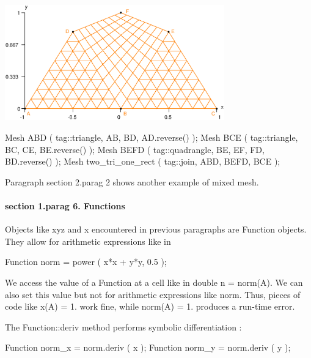{ 
\centerline{\includegraphics[width=95mm]{two-tri-one-rect.eps}} }

\verbatim
   Mesh ABD ( tag::triangle, AB, BD, AD.reverse() );
   Mesh BCE ( tag::triangle, BC, CE, BE.reverse() );
   Mesh BEFD ( tag::quadrangle, BE, EF, FD, BD.reverse() );
   Mesh two_tri_one_rect ( tag::join, ABD, BEFD, BCE );
\endverbatim

Paragraph \numb section 2.\numb parag 2 shows another example of mixed mesh.


\paragraph{\numb section 1.\numb parag 6. Functions}

Objects like {\codett xyz} and {\codett x} encountered in previous paragraphs
are {\codett Function} objects.
They allow for arithmetic expressions like in

\verbatim
   Function norm = power ( x*x + y*y, 0.5 );
\endverbatim

We access the value of a {\codett Function} at a cell like in {\codett double n = norm(A)}.
We can also set this value but not for arithmetic expressions like {\codett norm}.
Thus, pieces of code like {\codett x(A) = 1.} work fine, while {\codett norm(A) = 1.}
produces a run-time error.

The {\codett Function::deriv} method performs symbolic differentiation :

\verbatim
   Function norm_x = norm.deriv ( x );
   Function norm_y = norm.deriv ( y );
\endverbatim


